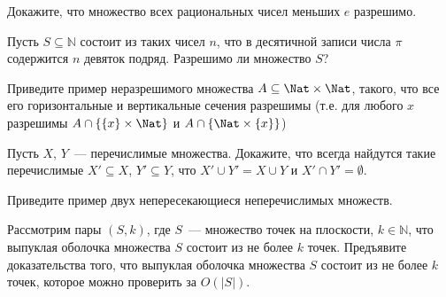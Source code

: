 \setcounter{curtask}{9}


\begin{task}
    Докажите, что множество всех рациональных чисел меньших $e$ разрешимо.
\end{task}

\begin{task}
    Пусть $S \subseteq \mathbb{N}$ состоит из таких чисел $n$, что в десятичной
    записи числа $\pi$ содержится $n$ девяток подряд. Разрешимо ли множество $S$?
\end{task}

\begin{task}
    Приведите пример неразрешимого множества $A \subseteq \Nat \times \Nat$,
    такого, что все его горизонтальные и вертикальные сечения
    разрешимы (т.е. для любого $x$ разрешимы $A \cap \{\{x\} \times \Nat\}$
    и $A \cap \{\Nat \times \{x\}\}$)
\end{task}

\begin{task}
    Пусть $X$, $Y$~--- перечислимые множества. Докажите, что всегда
    найдутся такие перечислимые $X' \subseteq X$, $Y' \subseteq Y$,
    что $X' \cup Y' = X \cup Y$ и $X' \cap Y' = \emptyset$.
\end{task}

\begin{task}
    Приведите пример двух непересекающиеся неперечислимых множеств.
\end{task}

\begin{task}
    Рассмотрим пары $(S, k)$, где $S$~--- множество точек на плоскости, $k
    \in \mathbb{N}$, что выпуклая оболочка множества $S$ состоит из не более $k$
    точек. Предъявите доказательства того, что выпуклая оболочка множества $S$
    состоит из не более $k$ точек, которое можно проверить за $O(|S|)$.
\end{task}